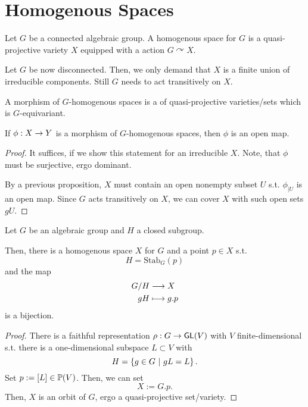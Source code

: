 \section{Homogenous Spaces}

\begin{definition}
	Let $G$ be a connected algebraic group. A homogenous space for $G$ is a quasi-projective variety $X$ equipped with a  action $G\curvearrowright X$.
	
	Let $G$ be now disconnected. Then, we only demand that $X$ is a finite union of irreducible components. Still $G$ needs to act transitively on $X$.
	
	A morphism of $G$-homogenous spaces is a  of quasi-projective varieties/sets which is $G$-equivariant.
\end{definition}
\begin{corollary}
	If $\phi : X \pfeil{} Y$ is a morphism of $G$-homogenous spaces, then $\phi$ is an open map.
\end{corollary}
\begin{proof}
	It suffices, if we show this statement for an irreducible $X$. Note, that $\phi$ must be surjective, ergo dominant.
	
	By a previous proposition, $X$ must contain an open nonempty subset $U$ s.t. $\phi_{|U}$ is an open map. Since $G$ acts transitively on $X$, we can cover $X$ with such open sets $gU$.
\end{proof}

\begin{proposition}
	Let $G$ be an algebraic group and $H$ a closed subgroup.
	
	Then, there is a homogenous space $X$ for $G$ and a point $p \in X$ s.t.
	\[ H = \mathrm{Stab}_G(p) \]
	and the map
	\begin{align*}
	G /H & \Pfeil{} X\\
	gH &\longmapsto g.p
	\end{align*}
	is a bijection.
\end{proposition}
\begin{proof}
	There is a faithful representation $\rho : G \pfeil{} \GL(V)$ with $V$ finite-dimensional s.t. there is a one-dimensional subspace $L \subset V$ with
	\[ H = \set{g \in G}{gL = L}. \]
	Set $p := [L] \in \P(V)$. Then, we can set
	\[ X := G.p. \]
	Then, $X$ is an orbit of $G$, ergo a quasi-projective set/variety.
\end{proof}